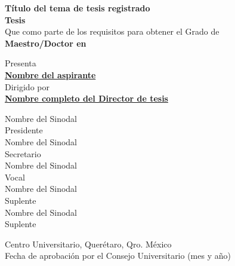             \begin{center}
                {\Large \textbf{Título del tema de tesis registrado}} \\
                \vspace{.8cm}
                {\Large \textbf{Tesis}} \\
                \vspace{0.5cm}
                {\large Que como parte de los requisitos para obtener el Grado de} \\
                \vspace{0.5cm}
                {\large \textbf{Maestro/Doctor en \underline{\hspace{3cm}}}}
                
                \vspace{1cm}
                {\large Presenta} \\
                \vspace{0.5cm}
                {\large \underline{\textbf{Nombre del aspirante}}} \\

                \vspace{1cm}
                {\large Dirigido por} \\
                \vspace{0.5cm}
                {\large \underline{\textbf{Nombre completo del Director de tesis}}} \\
            \end{center}
\vspace{1cm}
    \begin{flushleft}
        Nombre del Sinodal\\
        Presidente\\
        \vspace{.2cm}
        Nombre del Sinodal\\
        Secretario\\
        \vspace{.2cm}
        Nombre del Sinodal\\
        Vocal\\
        \vspace{.2cm}
        Nombre del Sinodal\\
        Suplente\\
        \vspace{.2cm}
        Nombre del Sinodal\\
        Suplente
        \vspace{.2cm}
    \end{flushleft}

\begin{center}
    Centro Universitario, Querétaro, Qro. México\\
Fecha de aprobación por el Consejo Universitario (mes y año)
\end{center}

\newpage